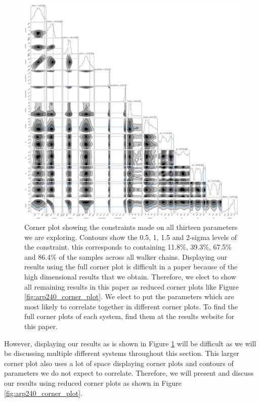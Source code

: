 \begin{figure}
    \centering
    \includegraphics[width=\textwidth]{Chapter1/figures/Arp240.pdf}
    \caption{Corner plot showing the constraints made on all thirteen parameters we are exploring. Contours show the 0.5, 1, 1.5 and 2-sigma levels of the constraint. this corresponds to containing 11.8\%, 39.3\%, 67.5\% and 86.4\% of the samples across all walker chains. Displaying our results using the full corner plot is difficult in a paper because of the high dimensional results that we obtain. Therefore, we elect to show all remaining results in this paper as reduced corner plots like Figure \ref{fig:arp240_corner_plot}. We elect to put the parameters which are most likely to correlate together in different corner plots. To find the full corner plots of each system, find them at the results website for this paper.}
    \label{fig:corner_plot}
\end{figure}

However, displaying our results as is shown in Figure \ref{fig:corner_plot} will be difficult as we will be discussing multiple different systems throughout this section. This larger corner plot also uses a lot of space displaying corner plots and contours of parameters we do not expect to correlate. Therefore, we will present and discuss our results using reduced corner plots as shown in Figure \ref{fig:arp240_corner_plot}.


